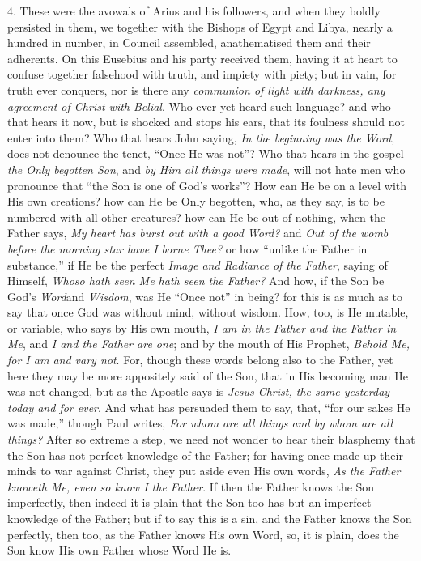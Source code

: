 4. These were
the avowals of Arius and his followers, and when they boldly persisted
in them, we together with the Bishops of Egypt and Libya, nearly a
hundred in number, in Council assembled, anathematised them and their
adherents. On this Eusebius and his party received them, having it at
heart to confuse together falsehood with truth, and impiety with
piety; but in vain, for truth ever conquers, nor is there any \emph{communion
of light with darkness, any agreement of Christ with Belial}. Who
ever yet heard such language? and who that hears it now, but is
shocked and stops his ears, that its foulness should not enter into
them? Who that hears John saying, \emph{In the beginning was the Word},
does not denounce the tenet, ``Once He was not''? Who that hears in the
gospel \emph{the Only begotten Son}, and \emph{by Him all things were
made}, will not hate men who pronounce that ``the Son is one of God's
works''? How can He be on a level with His own creations? how can He be
Only begotten, who, as they say, is to be numbered with all other
creatures? how can He be out of nothing, when the Father says, \emph{My
heart has burst out with a good Word?} and \emph{Out of the womb
before the morning star have I borne Thee?} or how ``unlike the
Father in substance,'' if He be the perfect \emph{Image and Radiance of
the Father}, saying of Himself, \emph{Whoso hath seen Me hath seen the
Father?} And how, if the Son be God's \emph{Word}and \emph{Wisdom},
was He ``Once not'' in being? for this is as much as to say that once
God was without mind, without wisdom. How, too, is He mutable, or
variable, who says by His own mouth, \emph{I am in the Father and the
Father in Me}, and \emph{I and the Father are one}; and by the
mouth of His Prophet, \emph{Behold Me, for I am and vary not}. For,
though these words belong also to the Father, yet here they may be
more appositely said of the Son, that in His becoming man He was not
changed, but as the Apostle says is \emph{Jesus Christ, the same
yesterday today and for ever}. And what has persuaded them to say,
that, ``for our sakes He was made,'' though Paul writes, \emph{For whom are
all things and by whom are all things?} After so extreme a step, we
need not wonder to hear their blasphemy that the Son has not perfect
knowledge of the Father; for having once made up their minds to war
against Christ, they put aside even His own words, \emph{As the Father
knoweth Me, even so know I the Father}. If then the Father knows
the Son imperfectly, then indeed it is plain that the Son too has but
an imperfect knowledge of the Father; but if to say this is a sin, and
the Father knows the Son perfectly, then too, as the Father knows His
own Word, so, it is plain, does the Son know His own Father whose Word
He is.

